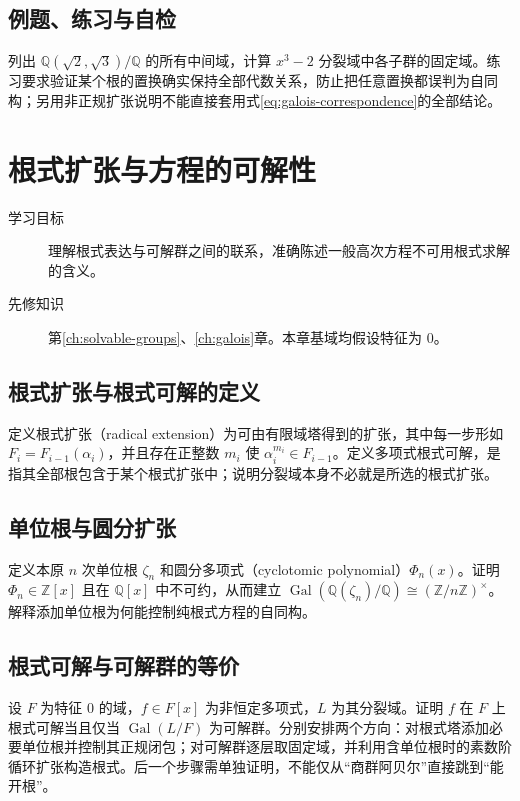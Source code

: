\documentclass[UTF8,12pt,a4paper,fontset=fandol]{ctexbook}
\begin{document}
\section{例题、练习与自检}
列出 $\mathbb Q(\sqrt2,\sqrt3)/\mathbb Q$ 的所有中间域，计算 $x^3-2$ 分裂域中各子群的固定域。练习要求验证某个根的置换确实保持全部代数关系，防止把任意置换都误判为自同构；另用非正规扩张说明不能直接套用式\eqref{eq:galois-correspondence}的全部结论。

\chapter{根式扩张与方程的可解性}\label{ch:radicals}

\begin{description}
  \item[学习目标] 理解根式表达与可解群之间的联系，准确陈述一般高次方程不可用根式求解的含义。
  \item[先修知识] 第\ref{ch:solvable-groups}、\ref{ch:galois}章。本章基域均假设特征为 $0$。
\end{description}

\section{根式扩张与根式可解的定义}
定义根式扩张（radical extension）为可由有限域塔得到的扩张，其中每一步形如 $F_i=F_{i-1}(\alpha_i)$，并且存在正整数 $m_i$ 使 $\alpha_i^{m_i}\in F_{i-1}$。定义多项式根式可解，是指其全部根包含于某个根式扩张中；说明分裂域本身不必就是所选的根式扩张。

\section{单位根与圆分扩张}
定义本原 $n$ 次单位根 $\zeta_n$ 和圆分多项式（cyclotomic polynomial）$\Phi_n(x)$。证明 $\Phi_n\in\mathbb Z[x]$ 且在 $\mathbb Q[x]$ 中不可约，从而建立 $\operatorname{Gal}(\mathbb Q(\zeta_n)/\mathbb Q)\cong(\mathbb Z/n\mathbb Z)^\times$。解释添加单位根为何能控制纯根式方程的自同构。

\section{根式可解与可解群的等价}
设 $F$ 为特征 $0$ 的域，$f\in F[x]$ 为非恒定多项式，$L$ 为其分裂域。证明 $f$ 在 $F$ 上根式可解当且仅当 $\operatorname{Gal}(L/F)$ 为可解群。分别安排两个方向：对根式塔添加必要单位根并控制其正规闭包；对可解群逐层取固定域，并利用含单位根时的素数阶循环扩张构造根式。后一个步骤需单独证明，不能仅从“商群阿贝尔”直接跳到“能开根”。
\end{document}
